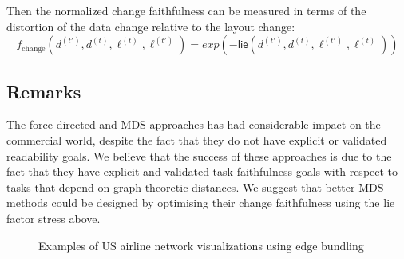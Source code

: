 \documentclass[10pt,journal,cspaper,compsoc]{IEEEtran}
\newcommand{\lie}{\textsf{lie}}
\begin{document}
Then the normalized change faithfulness can be measured in terms of the distortion of the data change relative to the layout change:
\begin{equation*}
f_\text{change}(d^{(t')},d^{(t)},\ell^{(t)}, \ell^{(t')})= exp (-\lie (d^{(t')},d^{(t)}, \ell^{(t')}, \ell^{(t)}))
\end{equation*}


\subsection{Remarks}
The force directed and MDS approaches has had considerable impact on the commercial world, despite the fact that they do not have explicit or validated readability goals. We believe that the success of these approaches is due to the fact that they have explicit and validated task faithfulness goals with respect to tasks that depend on graph theoretic distances. We suggest that better MDS methods could be designed by optimising their change faithfulness using the lie factor stress above.


\begin{figure*}\centering
\hspace{1.2cm}
\hspace{2.3cm}
\caption{Examples of US airline network visualizations using edge bundling}\label{fig:bundlingair}
\end{figure*}
\end{document}

